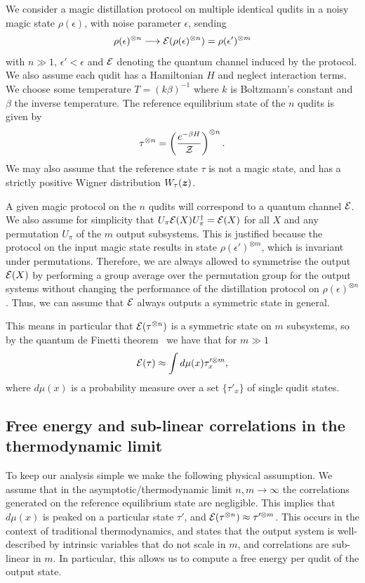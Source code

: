 \documentclass[pra,
aps,
twocolumn,
superscriptaddress,
groupedaddress,
nofootinbib,
reprint
]{revtex4-1}
\begin{document}
We consider a magic distillation protocol on multiple identical qudits in a noisy magic state $\rho(\epsilon)$, with noise parameter $\epsilon$, sending 
\begin{equation}
\rho(\epsilon)^{\otimes n} \longrightarrow {\mathcal E}(\rho(\epsilon)^{\otimes n}) =\rho(\epsilon')^{\otimes m}
\end{equation}
with $n \gg 1$, $\epsilon' <\epsilon$ and ${\mathcal E}$ denoting the quantum channel induced by the protocol. We also assume each qudit has a Hamiltonian $H$ and neglect interaction terms. We choose some temperature $T = (k\beta)^{-1}$ where $k$ is Boltzmann's constant and $\beta$ the inverse temperature. The reference equilibrium state of the $n$ qudits is given by
\begin{equation}
\tau^{\otimes n} = \left ( \frac{e^{-\beta H}}{\mathcal{Z}} \right )  ^{\otimes n}.
\end{equation}
We may also assume that the reference state $\tau$ is not a magic state, and has a strictly positive Wigner distribution $W_\tau(\bm{z})$.

A given magic protocol on the $n$ qudits will correspond to a quantum channel ${\mathcal E}$. We also assume for simplicity that $U_\pi{\mathcal E}(X) U_\pi^\dagger = {\mathcal E}(X)$ for all $X$ and any permutation $U_\pi$ of the $m$ output subsystems. This is justified because the protocol on the input magic state results in state $\rho(\epsilon')^{\otimes m}$, which is invariant under permutations. Therefore, we are always allowed to symmetrise the output ${\mathcal E}(X)$ by performing a group average over the permutation group for the output systems without changing the performance of the distillation protocol on $\rho(\epsilon)^{\otimes n}$. Thus, we can assume that ${\mathcal E}$ always outputs a symmetric state in general.

This means in particular that ${\mathcal E}(\tau^{\otimes n})$ is a symmetric state on $m$ subsystems, so by the quantum de Finetti theorem~\cite{christandl_2007}  we have that for $m \gg 1$
\begin{equation}
{\mathcal E}(\tau) \approx \int d\mu(x) \tau_x^{\prime \otimes m},
\end{equation}
where $d\mu(x)$ is a probability measure over a set $\{\tau'_x\}$ of single qudit states.

\subsection{Free energy and sub-linear correlations in the thermodynamic limit}
To keep our analysis simple we make the following physical assumption. We assume that in the asymptotic/thermodynamic limit $n,m \rightarrow \infty$ the correlations generated on the reference equilibrium state are negligible. This implies that $d\mu(x)$ is peaked on a particular state $\tau'$, and ${\mathcal E}(\tau^{\otimes n}) \approx \tau'^{\otimes m}$. This occurs in the context of traditional thermodynamics, and states that the output system is well-described by intrinsic variables that do not scale in $m$, and correlations are sub-linear in $m$. In particular, this allows us to compute a free energy per qudit of the output state. 
\end{document}
